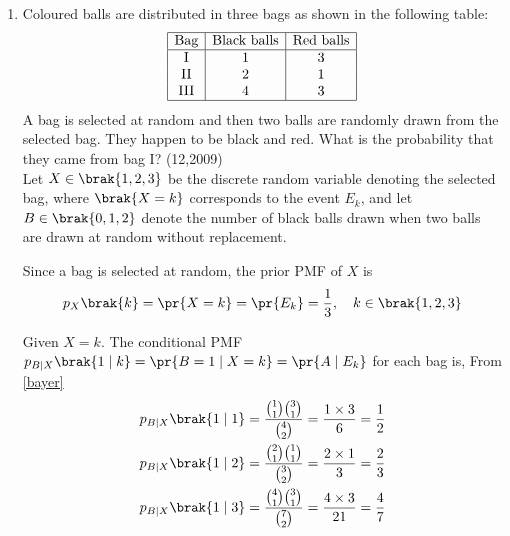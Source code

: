 \begin{enumerate}[label=\thesubsection.\arabic*, ref=\thesubsection.\theenumi]
\begin{align}
 	\xrightarrow{R_1 \to R_1 - R_2}	\myvec{1 & 0 & 0 & \vline & 3 & -1 & 1 \\ 0 & 1 & 0 & \vline & -15 & 6 & -5 \\ 0 & 0 & 1 & \vline & 5 & -2 & 2}	
 			\end{align}
 			\begin{align}
 				\mathbf{A}^{-1} = \myvec{3 & -1 & 1 \\ -15 & 6 & -5 \\ 5 & -2 & 2}
 			\end{align}
 \item Coloured balls are distributed in three bags as shown in the following table:$$\begin{array}{|c|c|c|} \hline \text{Bag} & \text{Black balls} & \text{Red balls} \\ \hline \text{I} & 1 & 3 \\ \text{II} & 2 & 1 \\ \text{III} & 4 & 3 \\ \hline \end{array}$$
 A bag is selected at random and then two balls are randomly drawn from the selected bag. They happen to be black and red. What is the probability that they came from bag I? \hfill{(12,2009)} \\
 \solution
 Let $X \in \brak{1, 2, 3}$ be the discrete random variable denoting the selected bag, where $\brak{X = k}$ corresponds to the event $E_k$, and let $B \in \brak{0, 1, 2}$ denote the number of black balls drawn when two balls are drawn at random without replacement.
 
 Since a bag is selected at random, the prior PMF of $X$ is
 \begin{align}
 	p_X\brak{k} = \pr{X = k} = \pr{E_k} = \frac{1}{3}, \quad k \in \brak{1, 2, 3}
 	\label{eq:prior-pmf}
 \end{align}
 
 Given $X = k$. The conditional PMF $p_{B \mid X}\brak{1 \mid k} = \pr{B = 1 \mid X = k} = \pr{A \mid E_k}$ for each bag is, \quad From \eqref{bayer}
 \begin{align}
 	p_{B \mid X}\brak{1 \mid 1} &= \frac{\binom{1}{1}\binom{3}{1}}{\binom{4}{2}} = \frac{1 \times 3}{6} = \frac{1}{2} \label{eq:cond-pmf}
 	\\
 	p_{B \mid X}\brak{1 \mid 2} &= \frac{\binom{2}{1}\binom{1}{1}}{\binom{3}{2}} = \frac{2 \times 1}{3} = \frac{2}{3}
 	\\
 	p_{B \mid X}\brak{1 \mid 3} &= \frac{\binom{4}{1}\binom{3}{1}}{\binom{7}{2}} = \frac{4 \times 3}{21} = \frac{4}{7}
 \end{align}
 

\end{enumerate}
